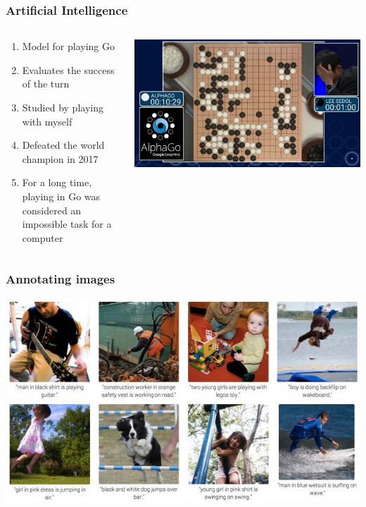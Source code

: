 \documentclass[default]{beamer}
\begin{document}
	\begin{frame}
		\frametitle{Artificial Intelligence}
		
		\begin{columns}
			\begin{column}{0.5\textwidth}
				\begin{enumerate}
					\item Model for playing Go
					\item Evaluates the success of the turn
					\item Studied by playing with myself
					\item Defeated the world champion in 2017
					\item For a long time, playing in Go was considered an impossible task for a computer
				\end{enumerate}
				
			\end{column}
			\begin{column}{0.5\textwidth}
				\centering
				\includegraphics[width=\textwidth]{da_intro2.jpg}
			\end{column}
		\end{columns}

	\end{frame}

	\begin{frame}
		\frametitle{Annotating images}
		
		\centering
		\includegraphics[width=\textwidth]{da_intro3.jpg}
	\end{frame}
\end{document}
